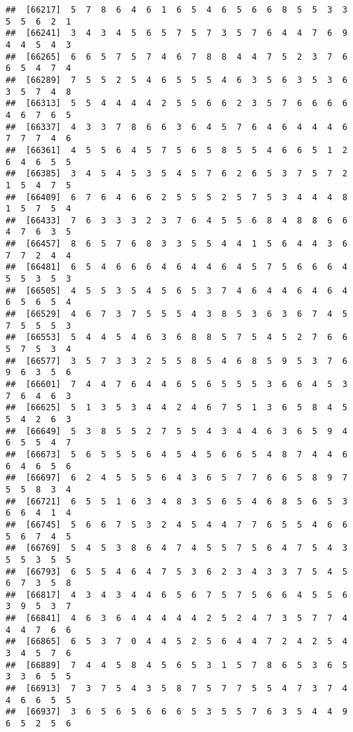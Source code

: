 \documentclass[
]{book}
\begin{document}
\begin{verbatim}
##  [66217]  5  7  8  6  4  6  1  6  5  4  6  5  6  6  8  5  5  3  3  5  5  6  2  1
##  [66241]  3  4  3  4  5  6  5  7  5  7  3  5  7  6  4  4  7  6  9  4  4  5  4  3
##  [66265]  6  6  5  7  5  7  4  6  7  8  8  4  4  7  5  2  3  7  6  6  5  4  7  4
##  [66289]  7  5  5  2  5  4  6  5  5  5  4  6  3  5  6  3  5  3  6  3  5  7  4  8
##  [66313]  5  5  4  4  4  4  2  5  5  6  6  2  3  5  7  6  6  6  6  4  6  7  6  5
##  [66337]  4  3  3  7  8  6  6  3  6  4  5  7  6  4  6  4  4  4  6  7  7  7  4  6
##  [66361]  4  5  5  6  4  5  7  5  6  5  8  5  5  4  6  6  5  1  2  6  4  6  5  5
##  [66385]  3  4  5  4  5  3  5  4  5  7  6  2  6  5  3  7  5  7  2  1  5  4  7  5
##  [66409]  6  7  6  4  6  6  2  5  5  5  2  5  7  5  3  4  4  4  8  1  5  7  5  4
##  [66433]  7  6  3  3  3  2  3  7  6  4  5  5  6  8  4  8  8  6  6  4  7  6  3  5
##  [66457]  8  6  5  7  6  8  3  3  5  5  4  4  1  5  6  4  4  3  6  7  7  2  4  4
##  [66481]  6  5  4  6  6  6  4  6  4  4  6  4  5  7  5  6  6  6  4  5  5  3  5  3
##  [66505]  4  5  5  3  5  4  5  6  5  3  7  4  6  4  4  6  4  6  4  6  5  6  5  4
##  [66529]  4  6  7  3  7  5  5  5  4  3  8  5  3  6  3  6  7  4  5  7  5  5  5  3
##  [66553]  5  4  4  5  4  6  3  6  8  8  5  7  5  4  5  2  7  6  6  5  7  5  3  4
##  [66577]  3  5  7  3  3  2  5  5  8  5  4  6  8  5  9  5  3  7  6  9  6  3  5  6
##  [66601]  7  4  4  7  6  4  4  6  5  6  5  5  5  3  6  6  4  5  3  7  6  4  6  3
##  [66625]  5  1  3  5  3  4  4  2  4  6  7  5  1  3  6  5  8  4  5  5  4  2  6  3
##  [66649]  5  3  8  5  5  2  7  5  5  4  3  4  4  6  3  6  5  9  4  6  5  5  4  7
##  [66673]  5  6  5  5  5  6  4  5  4  5  6  6  5  4  8  7  4  4  6  6  4  6  5  6
##  [66697]  6  2  4  5  5  5  6  4  3  6  5  7  7  6  6  5  8  9  7  5  5  8  3  4
##  [66721]  6  5  5  1  6  3  4  8  3  5  6  5  4  6  8  5  6  5  3  6  6  4  1  4
##  [66745]  5  6  6  7  5  3  2  4  5  4  4  7  7  6  5  5  4  6  6  5  6  7  4  5
##  [66769]  5  4  5  3  8  6  4  7  4  5  5  7  5  6  4  7  5  4  3  5  5  3  5  5
##  [66793]  6  5  5  4  6  4  7  5  3  6  2  3  4  3  3  7  5  4  5  6  7  3  5  8
##  [66817]  4  3  4  3  4  4  6  5  6  7  5  7  5  6  6  4  5  5  6  3  9  5  3  7
##  [66841]  4  6  3  6  4  4  4  4  4  2  5  2  4  7  3  5  7  7  4  4  4  7  6  6
##  [66865]  6  5  3  7  0  4  4  5  2  5  6  4  4  7  2  4  2  5  4  3  4  5  7  6
##  [66889]  7  4  4  5  8  4  5  6  5  3  1  5  7  8  6  5  3  6  5  3  3  6  5  5
##  [66913]  7  3  7  5  4  3  5  8  7  5  7  7  5  5  4  7  3  7  4  4  6  6  5  5
##  [66937]  3  6  5  6  5  6  6  6  5  3  5  5  7  6  3  5  4  4  9  6  5  2  5  6

\end{verbatim}
\end{document}
